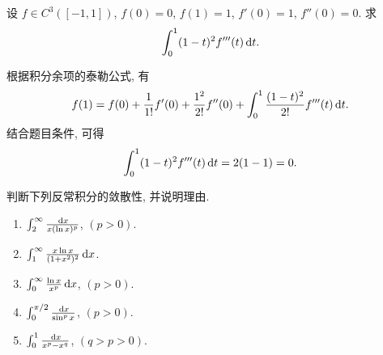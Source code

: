 \documentclass{article}
\begin{document}
\begin{problem}
设 $f \in C^3([-1,1])$, $f(0)=0$, $f(1)=1$, $f'(0)=1$, $f''(0)=0$. 求
\[
\int_0^1 (1-t)^2 f'''(t)\,\mathrm{d} t.
\]
\end{problem}

\begin{solution}
  根据积分余项的泰勒公式, 有
  \[ f(1)
  =f(0)+\frac{1}{1!}f'(0)+\frac{1^2}{2!}f''(0)+\int_{0}^{1}\frac{(1-t)^2}{2!}f'''(t)\,\mathrm{d} t. \]
  结合题目条件, 可得
  \[ \int_0^1 (1-t)^2 f'''(t)\,\mathrm{d} t=2(1-1)=0. \]
\end{solution}



\begin{problem}
判断下列反常积分的敛散性, 并说明理由.
\begin{enumerate}[label=(\alph*)]
\item $\int_2^\infty \frac{\,\mathrm{d} x}{x(\ln x)^p}$, $(p>0)$.
\item $\int_1^\infty \frac{x\ln x}{(1+x^2)^2}\,\mathrm{d} x$.
\item $\int_0^\infty \frac{\ln x}{x^p}\,\mathrm{d} x$, $(p>0)$.
\item $\int_0^{\pi/2} \frac{\,\mathrm{d} x}{\sin^p x}$, $(p>0)$.
\item $\int_0^1 \frac{\,\mathrm{d} x}{x^p - x^q}$, $(q>p>0)$.
\end{enumerate}
\end{problem}
\end{document}
